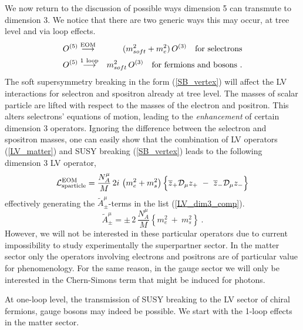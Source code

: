 \documentclass[12pt]{revtex4}
\begin{document}
We now return to the discussion of possible ways dimension 5 
can transmute to dimension 3. We notice that there are two generic ways this 
may occur, at tree level and via loop effects.
\begin{eqnarray*}
\nonumber
O^{(5)} & \stackrel{\mathrm {EOM}}{\longrightarrow} &
  (m_{soft}^2 + m_e^2)\, O^{(3)}~~~{\rm for~selectrons}\\
\nonumber
O^{(5)} & \stackrel{\mathrm {1\ loop}}{\longrightarrow} &
  m_{soft}^2\, O^{(3)} ~~~{\rm for~fermions ~and ~bosons}
~.
\end{eqnarray*}
The soft supersymmetry
breaking in the form (\ref{SB_vertex}) will affect the
LV interactions for selectron and spositron already at tree level.
The  masses of scalar particle are lifted with
respect to the masses of the electron and positron. 
This alters selectrons' equations of motion, leading to the 
{\em enhancement} of certain dimension 3 operators. Ignoring 
the difference between the selectron and spositron
masses, one can easily show that the combination of LV operators (\ref{LV_matter}) and 
SUSY breaking (\ref{SB_vertex}) leads to the following dimension 3 LV operator,
\begin{equation}
  \mathcal{L}_{\rm sparticle}^{\rm EOM} = 
\frac{N_A^\mu}{M}\, 2 i\, 
\left(
m_e^2 + m_s^2
\right)
\Bigl\{ 
\overline{z}_+ \mathcal{D}_\mu z_+ 
~-~
\overline{z}_- \mathcal{D}_\mu z_- 
\Bigr\}
\end{equation}
effectively  generating the $ \widetilde{A}^\mu_\pm $-terms in 
the list (\ref{LV_dim3_comp}). \begin{equation}
\widetilde{A}_\pm^\mu = 
\pm\, 2\, \frac{N_A^\mu}
                        { M }   
\left\{
m_e^2 ~+~ m_s^2
\right\}~.
\end{equation}
However, we will not be interested in these particular operators 
due to current impossibility to study experimentally  the superpartner sector. 
In the matter sector only the operators involving electrons and positrons are 
     of particular value for phenomenology.  
For the same reason, in the gauge sector we will only be interested
in the Chern-Simons term that might be induced for photons.

At one-loop level, the transmission 
of SUSY breaking to the LV sector of chiral fermions, gauge bosons may indeed
be possible. We start with the 1-loop effects in the matter sector.
\end{document}
